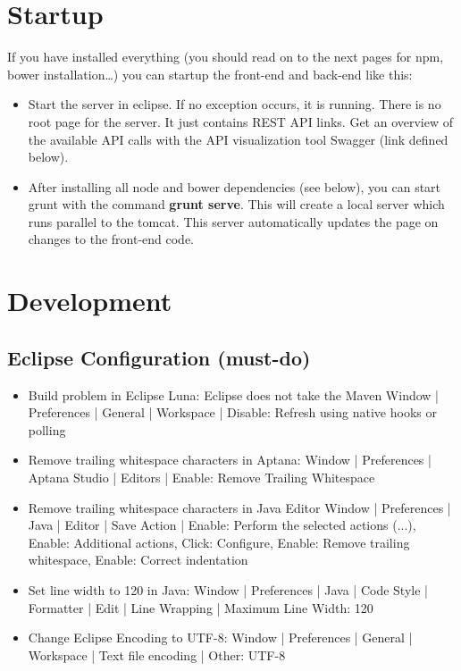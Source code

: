 \section{Startup}
If you have installed everything (you should read on to the next pages for npm, bower installation…) you can startup the front-end and back-end like this:
\begin{itemize}
	\item Start the server in eclipse. If no exception occurs, it is running. There is no root page for the server. It just contains REST API links. Get an overview of the available API calls with the API visualization tool Swagger (link defined below).
	\item After installing all node and bower dependencies (see below), you can start grunt with the command \textbf{grunt serve}. This will create a local server which runs parallel to the tomcat. This server automatically updates the page on changes to the front-end code. 
\end{itemize}

\section{Development}
\subsection{Eclipse Configuration (must-do)}
\begin{itemize}
	\item Build problem in Eclipse Luna: Eclipse does not take the Maven 
	Window | Preferences | General | Workspace | Disable: Refresh using native hooks or polling
	\item Remove trailing whitespace characters in Aptana:
	Window | Preferences | Aptana Studio | Editors | Enable: Remove Trailing Whitespace
	\item Remove trailing whitespace characters in Java Editor
	Window | Preferences | Java | Editor | Save Action | Enable: Perform the selected actions (...), Enable: Additional actions, Click: Configure, Enable: Remove trailing whitespace, Enable: Correct indentation
	\item Set line width to 120 in Java:
	Window | Preferences | Java | Code Style | Formatter | Edit | Line Wrapping | Maximum Line Width: 120
	\item Change Eclipse Encoding to UTF-8:
	Window | Preferences | General | Workspace | Text file encoding | Other: UTF-8
\end{itemize}


